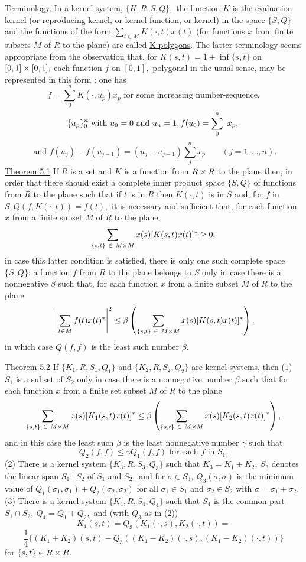 Terminology.  In a kernel-system, $\{K,R , S,Q\},$ the function $K$ is the \underline{evaluation kernel} (or reproducing kernel, or kernel function, or kernel) in the space $\{S, Q\}$ and the functions of the form $\sum_{t \in M}K(\cdot ,t)x(t)$ (for functions $x$ from finite subsets $M$ of $R$ to the plane) are called \underline{K-polygons}.  The latter terminology seems appropriate from the observation that, for $K(s,t) = 1 + \inf\{s,t\}$ on $[0,1]\times [0,1],$ each function $f$ on $[0,1],$ polygonal in the usual sense, may be represented in this form :  one has \nl
\[
f = \sum\limits_{0}^{n}K(\cdot , u_{p})x_{p} \text{~for~some~increasing~number-sequence,}
\]
\[
\{u_{p}\}_{0}^{n}\text{~with~}u_{0} = 0\text{~and~}u_{n} = 1, f(u_{0}) =  \sum\limits_{0}^{n}~x_{p},\nl
\]
\[
\text{~and~}f(u_{j}) - f(u_{j - 1}) = (u_{j} - u_{j-1})\sum\limits_{j}^{n}x_{p} \qquad(j = 1, \dots ,n).
\]
\underline{Theorem 5.1}  If $R$ is a set and $K$ is a function from $R\times R$ to the plane then, in order that there should exist a complete inner product space $\{S,Q\}$ of functions from $R$ to the plane such that if $t$ is in $R$ then $K(\cdot ,t)$ is in $S$ and, for $f$ in $S, Q(f,K(\cdot ,t)) = f(t),$ it is necessary and sufficient that, for each function $x$ from a finite subset $M$ of $R$ to the plane,\nl
\[
\sum\limits_{\{s,t\}~\in~M\times M}x(s)[K(s,t)x(t)]^{*} \geq 0;
\]
in case this latter condition is satisfied, there is only one such complete space $\{S, Q\}$: a function $f$ from $R$ to the plane belongs to $S$ only in case there is a nonnegative $\beta$ such that, for each function $x$ from a finite subset $M$ of $R$ to the plane\nl
\[
\left|~\sum\limits_{t \in M}f(t)x(t)^{*}\right|^{2} \leq \beta \left(\sum\limits_{\{s,t\} ~\in ~M\times M}x(s)[K(s,t)x(t)]^{*}\right),
\]
in which case $Q(f,f)$ is the least such number $\beta .$\nl

\underline{Theorem 5.2}  If $\{K_{1},R,S_{1},Q_{1}\}$ and $\{K_{2},R,S_{2},Q_{2}\}$ are kernel systems, then\nl
(1)  $S_{1}$ is a subset of $S_{2}$ only in case there is a nonnegative number $\beta$ such that for each function $x$ from a finite set subset $M$ of $R$ to the plane\nl
\[
\sum\limits_{\{s,t\}~ \in ~M\times M}x(s)[K_{1}(s,t)x(t)]^{*} \leq \beta\left(\sum\limits_{\{s,t\}~ \in ~M\times M}x(s)[K_{2}(s,t)x(t)]^{*}\right),
\]
and in this case the least such $\beta$ is the least nonnegative number $\gamma$ such that \nl
\[
Q_{2}(f, f) \leq \gamma Q_{1}(f,f)\text{~for~each~}f \text{~in~}S_{1}.
\]
(2) There is a kernel system $\{K_{3},R,S_{3},Q_{3}\}$ such that $K_{3} = K_{1} + K_{2},~S_{3}$ denotes the linear span $S_{1} \overset{.}{+} S_{2}$ of $S_{1}$ and $S_{2},$ and for $\sigma \in S_{3},~Q_{3}(\sigma, \sigma)$ is the minimum value of $Q_{1}(\sigma_{1},\sigma_{1}) +  Q_{2}(\sigma_{2}, \sigma_{2})$ for all $\sigma_{1} \in S_{1}$
 and $\sigma_{2} \in S_{2}$ with $\sigma = \sigma_{1} + \sigma_{2}.$\nl
(3) There is a kernel system $\{K_{4}, R, S_{4}, Q_{4}\}$ such that $S_{4}$ is the common part\nl $S_{1}\cap S_{2},~Q_{4} = Q_{1} + Q_{2},$ and (with $Q_{3}$ as in (2))\nl
\[
K_{4}(s,t) = Q_{3}(K_{1}(\cdot, s), K_{2}(\cdot, t)) =
\]
\[
\dfrac{1}{4}\{(K_{1} + K_{2})(s,t) - Q_{3}((K_{1} - K_{2})(\cdot,s),(K_{1} - K_{2})(\cdot,t)) \}
\]\nl
for $\{s,t\} \in R\times R.$\nl

